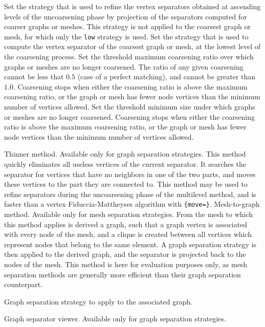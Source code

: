\begin{itemize}
\begin{itemize}
Set the strategy that is used to refine the vertex separators obtained
at ascending levels of the uncoarsening phase by projection of the
separators computed for coarser graphs or meshes.  This strategy is
not applied to the coarsest graph or mesh, for which only the
{\tt low} strategy is used.
\iteme[{\tt low=}{\it strat}]
Set the strategy that is used to compute the vertex separator of the
coarsest graph or mesh, at the lowest level of the coarsening process.
\iteme[{\tt rat=}{\it rat}]
Set the threshold maximum coarsening ratio over which graphs or meshes
are no longer coarsened. The ratio of any given coarsening cannot be
less that $0.5$ (case of a perfect matching), and cannot be greater
than $1.0$. Coarsening stops when either the coarsening ratio is
above the maximum coarsening ratio, or the graph or mesh has fewer
node vertices than the minimum number of vertices allowed.
\iteme[{\tt vert=}{\it nbr}]
Set the threshold minimum size under which graphs or meshes are no longer
coarsened. Coarsening stops when either the coarsening ratio is above the
maximum coarsening ratio, or the graph or mesh has fewer node vertices
than the minimum number of vertices allowed.
\end{itemize}
\iteme[{\tt t}]
Thinner method. Available only for graph separation strategies.
This method quickly eliminates all useless vertices of
the current separator. It searches the separator for vertices that
have no neighbors in one of the two parts, and moves these vertices to
the part they are connected to. This method may be used to refine
separators during the uncoarsening phase of the multilevel method,
and is faster than a vertex Fiduccia-Mattheyses algorithm with
{\tt \{move\lbt =\}}.
\iteme[{\tt v}]
Mesh-to-graph method. Available only for mesh separation strategies.
From the mesh to which this method applies is derived a graph,
such that a graph vertex is associated with every node of the
mesh, and a clique is created between all vertices which represent
nodes that belong to the same element. A graph separation strategy is
then applied to the derived graph, and the separator is projected
back to the nodes of the mesh. This method is here for evaluation
purposes only, as mesh separation methods are generally more
efficient than their graph separation counterpart.
\begin{itemize}
\iteme[{\tt strat=}{\it strat}]
Graph separation strategy to apply to the associated graph.
\end{itemize}
\iteme[{\tt w}]
Graph separator viewer. Available only for graph separation strategies.

\end{itemize}
